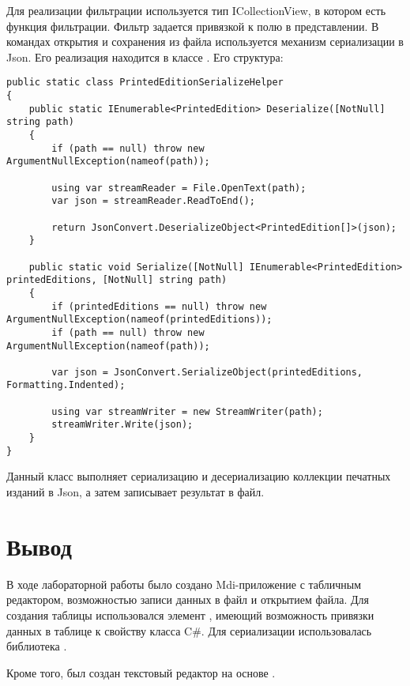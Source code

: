 \documentclass[a4paper,14pt]{extarticle}
\begin{document}
Для реализации фильтрации используется тип ICollectionView, в котором есть функция
фильтрации. Фильтр задается привязкой к полю в представлении. В командах открытия
и сохранения из файла используется механизм сериализации в Json. Его реализация находится
в классе . Его структура:

\begin{lstlisting}
public static class PrintedEditionSerializeHelper
{
    public static IEnumerable<PrintedEdition> Deserialize([NotNull] string path)
    {
        if (path == null) throw new ArgumentNullException(nameof(path));

        using var streamReader = File.OpenText(path);
        var json = streamReader.ReadToEnd();

        return JsonConvert.DeserializeObject<PrintedEdition[]>(json);
    }

    public static void Serialize([NotNull] IEnumerable<PrintedEdition> printedEditions, [NotNull] string path)
    {
        if (printedEditions == null) throw new ArgumentNullException(nameof(printedEditions));
        if (path == null) throw new ArgumentNullException(nameof(path));

        var json = JsonConvert.SerializeObject(printedEditions, Formatting.Indented);

        using var streamWriter = new StreamWriter(path);
        streamWriter.Write(json);
    }
}
\end{lstlisting}

Данный класс выполняет сериализацию и десериализацию коллекции печатных изданий в Json,
а затем записывает результат в файл.

\section*{Вывод}
В ходе лабораторной работы было создано Mdi-приложение с табличным редактором, возможностью
записи данных в файл и открытием файла. Для создания таблицы использовался элемент
, имеющий возможность привязки данных в таблице к свойству класса C\#.
Для сериализации использовалась библиотека .

Кроме того, был создан текстовый редактор на основе .
\end{document}
